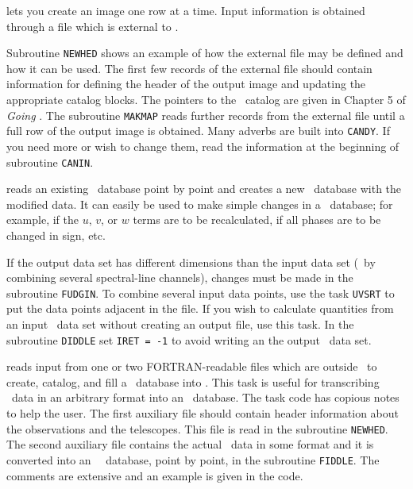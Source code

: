      {\tt {}} lets you create an image one row at a time.
Input information is obtained through a file which is external to
\hbox{\AIPS}.

\xben
\Item Subroutine {\tt NEWHED} shows an example of how the
    external file may be defined and how it can be used. The first few
    records of the external file should contain information for
    defining the header of the output image and updating the
    appropriate catalog blocks.  The pointers to the \AIPS\ catalog
    are given in Chapter 5 of {\it Going\/} \hbox{\AIPS}.
\Item The subroutine {\tt MAKMAP} reads further records from the
    external file until a full row of the output image is obtained.
\Item Many adverbs are built into \hbox{{\tt CANDY}}.  If you
    need more or wish to change them, read the information at the
    beginning of subroutine \hbox{{\tt CANIN}}.
\xeen

     {\tt {}} reads an existing \uv\ database point by point
and creates a new \uv\ database with the modified data.  It can easily
be used to make simple changes in a \uv\ database; for example, if the
$u$, $v$, or $w$ terms are to be recalculated, if all phases are to be
changed in sign, etc.

\xben
\Item If the output data set has different dimensions than the
    input data set (\eg\ by combining several spectral-line channels),
    changes must be made in the subroutine \hbox{{\tt FUDGIN}}.
\Item To combine several input data points, use the task {\tt UVSRT}
    to put the data points adjacent in the file.
\Item If you wish to calculate quantities from an input \uv\ data
    set without creating an output file, use this task.  In the
    subroutine {\tt DIDDLE} set {\tt IRET = -1} to avoid writing an
    the output \uv\ data set.
\xeen

     {\tt {}} reads input from one or two FORTRAN-readable
files which are outside \AIPS\ to create, catalog, and fill a \uv\
database into \hbox{\AIPS}.  This task is useful for transcribing \uv\
data in an arbitrary format into an \AIPS\ database.
\iodx{paraform tasks}\iodx{task}
\xben
\Item The task code has copious notes to help the user.  The
    first auxiliary file should contain header information about the
    observations and the telescopes.  This file is read in the
    subroutine \hbox{{\tt NEWHED}}.
\Item The second auxiliary file contains the actual \uv\ data in
    some format and it is converted into an \AIPS\ \uv\ database,
    point by point, in the subroutine \hbox{{\tt FIDDLE}}.  The
    comments are extensive and an example is given in the code.
\xeen

